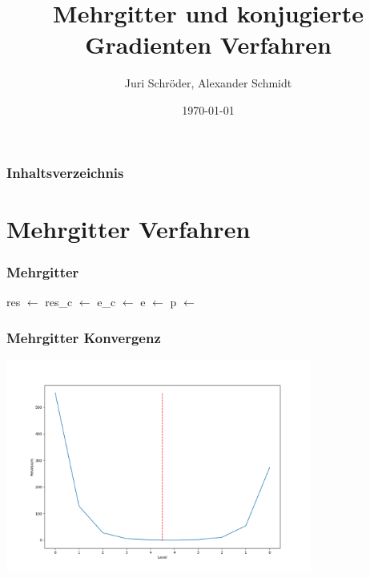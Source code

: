 \documentclass[]{beamer}
\title{Mehrgitter und konjugierte Gradienten Verfahren}
\author{Juri Schröder, Alexander Schmidt}
\date{\today}
\begin{document}
\begin{frame}
\titlepage
\end{frame}

\begin{frame}
\frametitle{Inhaltsverzeichnis}
\tableofcontents
\end{frame}


\section{Mehrgitter Verfahren}
\begin{frame}
  \frametitle{Mehrgitter}
  \begin{algorithmic}
    \State {}
    \State res $\gets$ 
    \State res\_c $\gets$ 
    \State {}
    \Else
    \State e\_c $\gets$ 
    \State e $\gets$ 
    \State p $\gets$ 
    \State {}
    \EndIf
    \EndFunction
  \end{algorithmic}
\end{frame}

\begin{frame}
  \frametitle{Mehrgitter Konvergenz}
  \begin{center}
    \includegraphics[width=0.9\linewidth, height=7cm]{MG_res_by_level.png}
  \end{center}
\end{frame}
\end{document}

